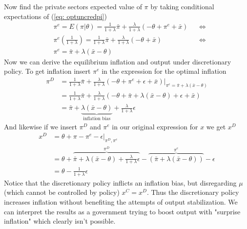 \documentclass[12pt, a4paper]{article}
\begin{document}
\begin{spacing}{1.213}
\begin{equation}
\end{equation}
Now find the private sectors expected value of $\pi$ by taking conditional expectations of (\ref{eq: optuncredpi})
\begin{align*}
&\pi^e = E(\pi|\theta) = \frac{1}{1+ \lambda} \bar{\pi} + \frac{\lambda}{1+ \lambda}(- \theta + \pi^e + \bar{x}) && \Leftrightarrow \\
&\pi^e \left( \frac{1}{1+ \lambda} \right)= \frac{1}{1+ \lambda} \bar{\pi} + \frac{\lambda}{1+ \lambda}(- \theta + \bar{x}) && \Leftrightarrow \\
& \pi^e =\bar{\pi} + \lambda(\bar{x} - \theta)
\end{align*}
Now we can derive the equilibrium inflation and output under discretionary policy. To get inflation insert $\pi^e$ in the expression for the optimal inflation
\begin{align*}
\pi^D &= \frac{1}{1+ \lambda} \bar{\pi} + \frac{\lambda}{1+ \lambda}(- \theta + \pi^e + \epsilon + \bar{x}) \bigg|_{\pi^e =\bar{\pi} + \lambda(\bar{x} - \theta) } \\
& = \frac{1}{1+ \lambda} \bar{\pi} + \frac{\lambda}{1+ \lambda}(- \theta + \bar{\pi} + \lambda(\bar{x} - \theta) + \epsilon + \bar{x}) \\
& = \bar{\pi} + \underbrace{\lambda(\bar{x}- \theta)}_{\textrm{inflation bias}} + \frac{\lambda}{1+ \lambda} \epsilon
\end{align*}
And likewise if we insert $\pi^D$ and $\pi^e$ in our original expression for $x$ we get $x^D$
\begin{align*}
x^D &= \theta + \pi - \pi^e - \epsilon \big|_{\pi^D, \pi^e} \\
&= \theta +  \overbrace{\bar{\pi} + \lambda(\bar{x}- \theta) + \frac{\lambda}{1+ \lambda} \epsilon}^{\pi^D} - \overbrace{(\bar{\pi}+ \lambda(\bar{x} - \theta))}^{\pi^e} - \epsilon \\
& = \theta - \frac{1}{1+\lambda} \epsilon
\end{align*}
Notice that the discretionary policy inflicts an inflation bias, but disregarding $\mu$ (which cannot be controlled by policy) $x^C = x^D$. Thus the discretionary policy increases inflation without benefiting the attempts of output stabilization. We can interpret the results as a government trying to boost output with "surprise inflation" which clearly isn't possible.



\end{spacing}
\end{document}
